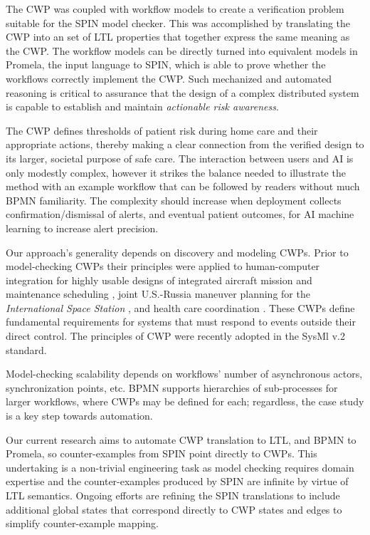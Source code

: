 The CWP was coupled with workflow models to create a verification problem suitable for the SPIN model checker. This was accomplished by translating the CWP into an set of LTL properties that together express the same meaning as the CWP. The workflow models can be directly turned into equivalent models in Promela, the input language to SPIN, which is able to prove whether the workflows correctly implement the CWP. Such mechanized and automated reasoning is critical to assurance that the design of a complex distributed system is capable to establish and maintain \emph{actionable risk awareness}. 

The CWP defines thresholds of patient risk during home care and their appropriate actions, thereby making a clear connection from the verified design to its larger, societal purpose of safe care. The interaction between users and AI is only modestly complex, however it strikes the balance needed to illustrate the method with an example workflow that can be followed by readers without much BPMN familiarity. 
The complexity should increase when deployment collects confirmation/dismissal of alerts, and eventual patient outcomes, for AI machine learning to increase alert precision.

Our approach's generality depends on discovery and modeling CWPs. Prior to model-checking CWPs their principles  were applied to human-computer integration for highly usable designs of integrated aircraft mission and maintenance scheduling \cite{workcentered}, joint U.S.-Russia maneuver planning for the \emph{International Space Station}  \cite{10.1145/1978942.1979311}, and health care coordination \cite{BERRY201615}. These CWPs define fundamental requirements for systems that must respond to events outside their direct control. The principles of CWP were recently adopted in the SysMl v.2 standard.

Model-checking scalability depends on workflows' number of asynchronous actors, synchronization points, etc. BPMN supports hierarchies of sub-processes for larger workflows, where CWPs may be defined for each; regardless, the case study is a key step towards automation. 

Our current research aims to automate CWP translation to LTL, and BPMN to Promela, so counter-examples from SPIN point directly to CWPs. This undertaking is a non-trivial engineering task as model checking requires domain expertise and the counter-examples produced by SPIN are infinite by virtue of LTL semantics. Ongoing efforts are refining the SPIN translations to include additional global states that correspond directly to CWP states and edges to simplify counter-example mapping. 

